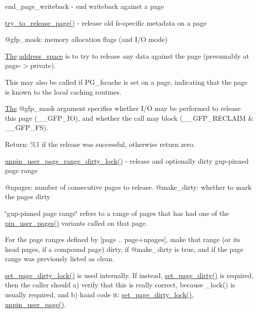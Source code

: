 end\+\_\+page\+\_\+writeback -\/ end writeback against a page

\mbox{\hyperlink{filemap_8c_a36341f6bc88dec984fc75fc7a033246e}{try\+\_\+to\+\_\+release\+\_\+page()}} -\/ release old fs-\/specific metadata on a page

@gfp\+\_\+mask\+: memory allocation flags (and I/O mode)

\mbox{\hyperlink{classThe}{The}} \mbox{\hyperlink{structaddress__space}{address\+\_\+space}} is to try to release any data against the page (presumably at page-\/$>$private).

This may also be called if P\+G\+\_\+fscache is set on a page, indicating that the page is known to the local caching routines.

\mbox{\hyperlink{classThe}{The}} @gfp\+\_\+mask argument specifies whether I/O may be performed to release this page (\+\_\+\+\_\+\+G\+F\+P\+\_\+\+IO), and whether the call may block (\+\_\+\+\_\+\+G\+F\+P\+\_\+\+R\+E\+C\+L\+A\+IM \& \+\_\+\+\_\+\+G\+F\+P\+\_\+\+FS).

Return\+: \%1 if the release was successful, otherwise return zero.

\mbox{\hyperlink{gup_8c_aaf10d99f0bc8b4e5f7fde4d3da2a84b6}{unpin\+\_\+user\+\_\+page\+\_\+range\+\_\+dirty\+\_\+lock()}} -\/ release and optionally dirty gup-\/pinned page range

@npages\+: number of consecutive pages to release. @make\+\_\+dirty\+: whether to mark the pages dirty

\char`\"{}gup-\/pinned page range\char`\"{} refers to a range of pages that has had one of the \mbox{\hyperlink{gup_8c_a42ce93a9eb4e23e2806c1f244fc61ee4}{pin\+\_\+user\+\_\+pages()}} variants called on that page.

For the page ranges defined by \mbox{[}page .. page+npages\mbox{]}, make that range (or its head pages, if a compound page) dirty, if @make\+\_\+dirty is true, and if the page range was previously listed as clean.

\mbox{\hyperlink{page-writeback_8c_add65097ae40e9c74fc839379ea5f23a1}{set\+\_\+page\+\_\+dirty\+\_\+lock()}} is used internally. If instead, \mbox{\hyperlink{page-writeback_8c_a7336f3a590bed267e17c0c13752753db}{set\+\_\+page\+\_\+dirty()}} is required, then the caller should a) verify that this is really correct, because \+\_\+lock() is usually required, and b) hand code it\+: \mbox{\hyperlink{page-writeback_8c_add65097ae40e9c74fc839379ea5f23a1}{set\+\_\+page\+\_\+dirty\+\_\+lock()}}, \mbox{\hyperlink{gup_8c_a660b424e7f87f459ffb8828df2a1bc75}{unpin\+\_\+user\+\_\+page()}}.

